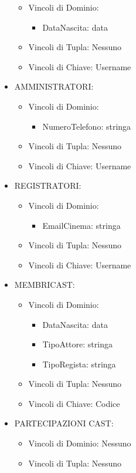 \documentclass[a4paper,12pt]{report}
\begin{document}
\begin{itemize}
	\begin{itemize}
		\item Vincoli di Dominio:
		\begin{itemize}
			\item DataNascita: data
		\end{itemize}
		\item Vincoli di Tupla: Nessuno
		\item Vincoli di Chiave: Username
	\end{itemize}
	\item AMMINISTRATORI:
	\begin{itemize}
		\item Vincoli di Dominio:
		\begin{itemize}
			\item NumeroTelefono: stringa
		\end{itemize}
		\item Vincoli di Tupla: Nessuno
		\item Vincoli di Chiave: Username
	\end{itemize}
	\item REGISTRATORI:
	\begin{itemize}
		\item Vincoli di Dominio:
		\begin{itemize}
			\item EmailCinema: stringa
		\end{itemize}
		\item Vincoli di Tupla: Nessuno
		\item Vincoli di Chiave: Username
	\end{itemize}
	\item MEMBRICAST:
	\begin{itemize}
		\item Vincoli di Dominio:
		\begin{itemize}
			\item DataNascita: data
			\item TipoAttore: stringa
			\item TipoRegista: stringa
		\end{itemize}
		\item Vincoli di Tupla: Nessuno
		\item Vincoli di Chiave: Codice
	\end{itemize}
	\item PARTECIPAZIONI CAST:
	\begin{itemize}
		\item Vincoli di Dominio: Nessuno
		\item Vincoli di Tupla: Nessuno

\end{itemize}
\end{itemize}
\end{document}
